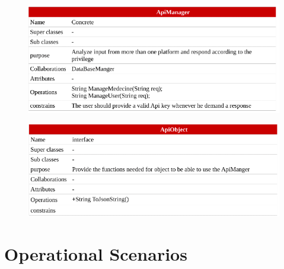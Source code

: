 \documentclass[]{article}
\begin{document}
\begin{figure}[H]
\centering
\includegraphics[scale=0.4]{./classdiagram/description/17}
\end{figure}

\begin{figure}[H]
\centering
\includegraphics[scale=0.4]{./classdiagram/description/18}
\end{figure}


\section{Operational Scenarios}
\end{document}
